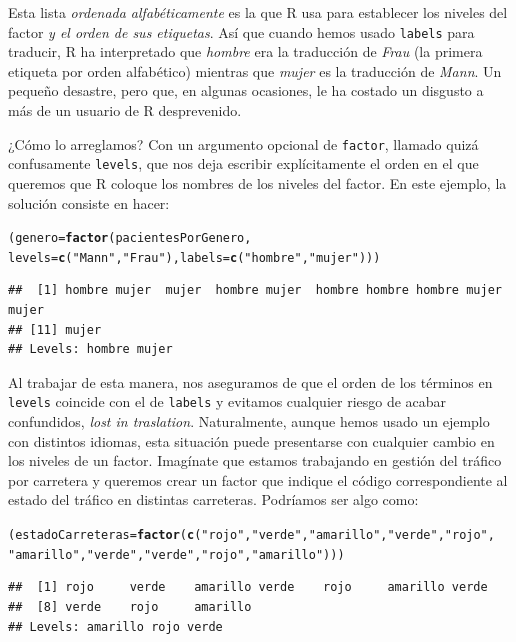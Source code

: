 \documentclass[10pt,a4paper]{article}\usepackage[]{graphicx}\usepackage[]{color}
\makeatletter
\newcommand{\hlstr}[1]{\textcolor[rgb]{0.192,0.494,0.8}{#1}}%
\newcommand{\hlstd}[1]{\textcolor[rgb]{0.345,0.345,0.345}{#1}}%
\newcommand{\hlkwb}[1]{\textcolor[rgb]{0.69,0.353,0.396}{#1}}%
\newcommand{\hlkwc}[1]{\textcolor[rgb]{0.333,0.667,0.333}{#1}}%
\newcommand{\hlkwd}[1]{\textcolor[rgb]{0.737,0.353,0.396}{\textbf{#1}}}%
\newenvironment{kframe}{%
 \def\at@end@of@kframe{}%
 \ifinner\ifhmode%
  \def\at@end@of@kframe{\end{minipage}}%
  \begin{minipage}{\columnwidth}%
 \fi\fi%
 \def\FrameCommand##1{\hskip\@totalleftmargin \hskip-\fboxsep
 \colorbox{shadecolor}{##1}\hskip-\fboxsep
     \hskip-\linewidth \hskip-\@totalleftmargin \hskip\columnwidth}%
 \MakeFramed {\advance\hsize-\width
   \@totalleftmargin\z@ \linewidth\hsize
   \@setminipage}}%
 {\par\unskip\endMakeFramed%
 \at@end@of@kframe}
\newenvironment{knitrout}{}{} %
\makeatother
\begin{document}
Esta lista {\em ordenada alfabéticamente} es la que R usa para establecer los niveles del factor {\em y el orden de sus etiquetas}. Así que cuando hemos usado {\tt labels} para traducir, R ha interpretado que {\em hombre} era la traducción de {\em Frau} (la primera etiqueta por orden alfabético) mientras que {\em mujer } es la traducción de {\em Mann}. Un pequeño desastre, pero que, en algunas ocasiones, le ha costado un disgusto a más de un usuario de R desprevenido.

¿Cómo lo arreglamos? Con un argumento opcional de {\tt factor}, llamado quizá confusamente {\tt levels},  que nos deja escribir explícitamente el orden en el que queremos que R coloque los nombres de los niveles del factor. En este ejemplo, la solución consiste en hacer:

\begin{knitrout}
\color{fgcolor}\begin{kframe}
\begin{alltt}
\hlstd{(genero} \hlkwb{=} \hlkwd{factor}\hlstd{(pacientesPorGenero,}
        \hlkwc{levels} \hlstd{=} \hlkwd{c}\hlstd{(}\hlstr{"Mann"}\hlstd{,} \hlstr{"Frau"}\hlstd{),} \hlkwc{labels}\hlstd{=}\hlkwd{c}\hlstd{(}\hlstr{"hombre"}\hlstd{,} \hlstr{"mujer"}\hlstd{)))}
\end{alltt}
\begin{verbatim}
##  [1] hombre mujer  mujer  hombre mujer  hombre hombre hombre mujer  mujer 
## [11] mujer 
## Levels: hombre mujer
\end{verbatim}
\end{kframe}
\end{knitrout}

Al trabajar de esta manera, nos aseguramos de que el orden de los términos en {\tt levels} coincide con el de {\tt labels} y evitamos cualquier riesgo de acabar confundidos, {\em lost in traslation}. Naturalmente, aunque hemos usado un ejemplo con distintos idiomas, esta situación puede presentarse con cualquier cambio en los niveles de un factor. Imagínate que estamos trabajando en gestión del tráfico por carretera y queremos crear un factor que indique el código correspondiente al estado del tráfico en distintas carreteras. Podríamos ser algo como:

\begin{knitrout}
\color{fgcolor}\begin{kframe}
\begin{alltt}
\hlstd{(estadoCarreteras} \hlkwb{=} \hlkwd{factor}\hlstd{(}\hlkwd{c}\hlstd{(}\hlstr{"rojo"}\hlstd{,} \hlstr{"verde"}\hlstd{,} \hlstr{"amarillo"}\hlstd{,} \hlstr{"verde"}\hlstd{,} \hlstr{"rojo"}\hlstd{,}
    \hlstr{"amarillo"}\hlstd{,} \hlstr{"verde"}\hlstd{,} \hlstr{"verde"}\hlstd{,} \hlstr{"rojo"}\hlstd{,} \hlstr{"amarillo"}\hlstd{)))}
\end{alltt}
\begin{verbatim}
##  [1] rojo     verde    amarillo verde    rojo     amarillo verde   
##  [8] verde    rojo     amarillo
## Levels: amarillo rojo verde
\end{verbatim}
\end{kframe}
\end{knitrout}
\end{document}
